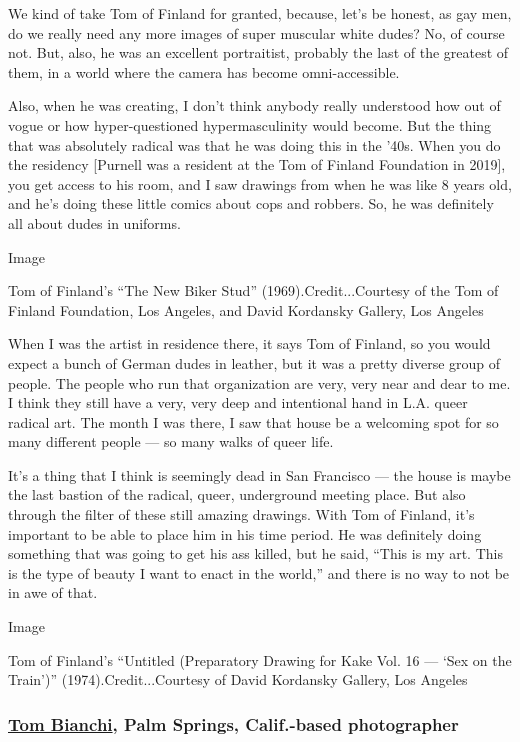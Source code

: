 We kind of take Tom of Finland for granted, because, let's be honest, as
gay men, do we really need any more images of super muscular white
dudes? No, of course not. But, also, he was an excellent portraitist,
probably the last of the greatest of them, in a world where the camera
has become omni-accessible.

Also, when he was creating, I don't think anybody really understood how
out of vogue or how hyper-questioned hypermasculinity would become. But
the thing that was absolutely radical was that he was doing this in the
'40s. When you do the residency {[}Purnell was a resident at the Tom of
Finland Foundation in 2019{]}, you get access to his room, and I saw
drawings from when he was like 8 years old, and he's doing these little
comics about cops and robbers. So, he was definitely all about dudes in
uniforms.

Image

Tom of Finland's ``The New Biker Stud'' (1969).Credit...Courtesy of the
Tom of Finland Foundation, Los Angeles, and David Kordansky Gallery, Los
Angeles

When I was the artist in residence there, it says Tom of Finland, so you
would expect a bunch of German dudes in leather, but it was a pretty
diverse group of people. The people who run that organization are very,
very near and dear to me. I think they still have a very, very deep and
intentional hand in L.A. queer radical art. The month I was there, I saw
that house be a welcoming spot for so many different people --- so many
walks of queer life.

It's a thing that I think is seemingly dead in San Francisco --- the
house is maybe the last bastion of the radical, queer, underground
meeting place. But also through the filter of these still amazing
drawings. With Tom of Finland, it's important to be able to place him in
his time period. He was definitely doing something that was going to get
his ass killed, but he said, ``This is my art. This is the type of
beauty I want to enact in the world,'' and there is no way to not be in
awe of that.

Image

Tom of Finland's ``Untitled (Preparatory Drawing for Kake Vol. 16 ---
`Sex on the Train')'' (1974).Credit...Courtesy of David Kordansky
Gallery, Los Angeles

\hypertarget{tom-bianchi-palm-springs-calif-based-photographer}{%
\subsubsection{\texorpdfstring{\textbf{\href{https://tmagazine.blogs.nytimes.com/2013/05/02/feeling-for-fire-island-memories/}{Tom
Bianchi}, Palm Springs, Calif.-based
photographer}}{Tom Bianchi, Palm Springs, Calif.-based photographer}}\label{tom-bianchi-palm-springs-calif-based-photographer}}


